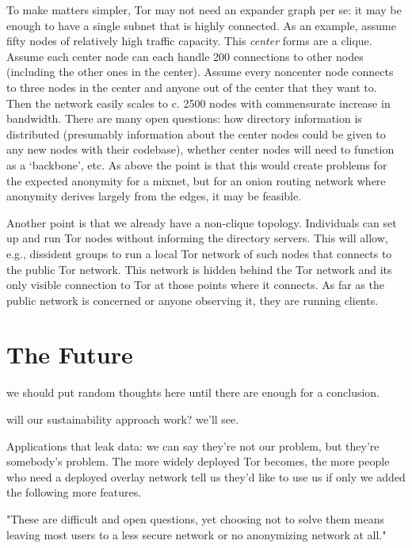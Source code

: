 \documentclass{llncs}
\begin{document}
To make matters simpler, Tor may not need an expander graph per se: it
may be enough to have a single subnet that is highly connected.  As an
example, assume fifty nodes of relatively high traffic capacity.  This
\emph{center} forms are a clique.  Assume each center node can each
handle 200 connections to other nodes (including the other ones in the
center). Assume every noncenter node connects to three nodes in the
center and anyone out of the center that they want to.  Then the
network easily scales to c. 2500 nodes with commensurate increase in
bandwidth. There are many open questions: how directory information
is distributed (presumably information about the center nodes could
be given to any new nodes with their codebase), whether center nodes
will need to function as a `backbone', etc. As above the point is
that this would create problems for the expected anonymity for a mixnet,
but for an onion routing network where anonymity derives largely from
the edges, it may be feasible.

Another point is that we already have a non-clique topology.
Individuals can set up and run Tor nodes without informing the
directory servers. This will allow, e.g., dissident groups to run a
local Tor network of such nodes that connects to the public Tor
network. This network is hidden behind the Tor network and its
only visible connection to Tor at those points where it connects.
As far as the public network is concerned or anyone observing it,
they are running clients.

\section{The Future}
\label{sec:conclusion}

we should put random thoughts here until there are enough for a
conclusion.

will our sustainability approach work? we'll see.

Applications that leak data: we can say they're not our problem, but
they're somebody's problem.
The more widely deployed Tor becomes, the more people who need a
deployed overlay network tell us they'd like to use us if only we added
the following more features.

"These are difficult and open questions, yet choosing not to solve them
means leaving most users to a less secure network or no anonymizing
network at all."

 
\end{document}
